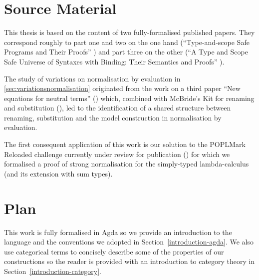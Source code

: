 \section{Source Material}

This thesis is based on the content of two fully-formalised published papers. They
correspond roughly to part one and two on the one hand
(``Type-and-scope Safe Programs and Their Proofs'' \cite{allais2017type, repo2017})
and part three on the other
(``A Type and Scope Safe Universe of Syntaxes with Binding: Their Semantics and Proofs''
\cite{generic-syntax, repo2018}).

The study of variations on normalisation by evaluation in \cref{sec:variationsnormalisation}
originated from the work on a third paper ``New equations for neutral terms''
(\cite{new-equations}) which, combined with McBride's Kit for renaming and substitution
(\citeyear{mcbride2005type}), led to the identification of a shared structure between renaming,
substitution and the model construction in normalisation by evaluation.

The first consequent application of this work is our solution to the
POPLMark Reloaded challenge currently under review for publication
(\cite{poplmarkreloaded, poplmark2}) for which we formalised a proof of
strong normalisation for the simply-typed lambda-calculus (and its extension
with sum types).



\section{Plan}

This work is fully formalised in Agda so we provide an introduction
to the language and the conventions we adopted in Section~\ref{introduction-agda}.
We also use categorical terms to concisely describe some of the
properties of our constructions so the reader is provided with an
introduction to category theory in Section~\ref{introduction-category}.



